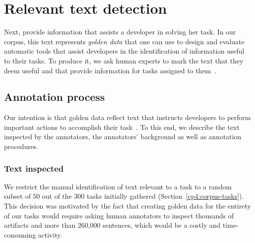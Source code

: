 


\section{Relevant text detection}
\label{cp4:corpus-relevant-text}




Next,  provide information that assists a developer in solving her task.
In our corpus, this text represents \textit{golden data} that one can use to design and evaluate automatic tools that assist developers in the identification of information useful to their tasks. 
To produce it, we 
ask human experts to
mark the text that they deem useful and that provide information for tasks assigned to them~\cite{nadi2020, Robillard2015, marques2020}.



\subsection{Annotation process}


Our intention is that golden data reflect text that instructs developers to perform important actions to accomplish their task~\cite{Robillard2015, Lotufo2012}.
To this end, we describe the text inspected by the annotators, the annotators' background as well as annotation procedures.
\textcolor{white}{\acs{stdv}} %



\subsubsection{Text inspected}




We restrict the manual identification of text relevant to a task to a random subset of 
50  out of the 300  tasks initially gathered (Section~\ref{cp4:corpus-tasks}).
This decision was motivated by the fact that 
creating golden data for the entirety of our tasks 
would require asking human annotators to inspect thousands of artifacts and more than 260,000 sentences, which would be a costly and time-consuming activity. 





